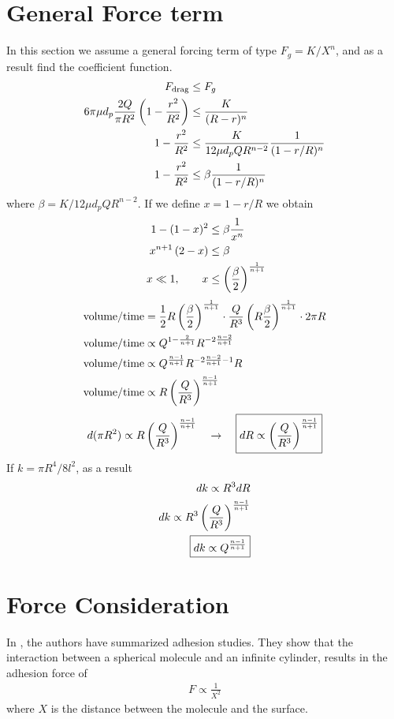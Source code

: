 %
\section{General Force term}
%
In this section we assume a general forcing term of type $F_{g} = K/X^n$, and
as a result find the coefficient function. 
%
\begin{align}
    F_{\text{drag}} &\leq  F_g \\
    6\pi \mu d_{p} \frac{2Q}{\pi R^2} \left( 1- \frac{r^2}{R^2} \right) & \leq \frac{K}{(R-r)^{n}} \\
    1 - \frac{r^2}{R^2} & \leq  \frac{K }{12 \mu  d_{p} Q R^{n-2}} \frac{1}{(1-r/R)^{n}}   \\
    1 -\frac{r^2}{R^2} &  \leq   \beta  \frac{1}{(1-r/R)^{n}}
\end{align}
%
where $\beta = {K }/{12 \mu d_{p} Q R^{n-2}} $. If we define $x = 1- r/R$ we obtain
%
\begin{align}
  1 - (1-x)^{2} & \leq \beta \frac{1}{x^{n}} \\
 x^{n+1} \left( 2 - x \right)  &\leq \beta  \\\
  x\ll 1 , \qquad x  & \leq \left( \frac{\beta}{2} \right)^{\frac{1}{n+1} } 
\end{align}
%
%
%
\begin{align}
  \text{volume}/\text{time} &= \frac{1}{2} R \left( \frac{\beta}{2} \right)^{\frac{1}{n+1} }  \cdot \frac{Q}{R^{3}} \left( R \frac{\beta}{2} \right)^{\frac{1}{n+1} } \cdot 2\pi R  \\
  \text{volume}/\text{time} &\propto  Q^{1 - \frac{2}{n+1} } R^{-2\frac{n-2}{n+1} } \\
  \text{volume}/\text{time} &\propto  Q^{\frac{n-1}{n+1} } R^{-2\frac{n-2}{n+1} -1}  R  \\
  \text{volume}/\text{time} &\propto  R  \left( \frac{Q}{R^{3}}   \right) ^{\frac{n-1}{n+1} }
\end{align}
%
%
\begin{align}
  d (\pi R^2) \propto R  \left( \frac{Q}{R^{3}}   \right) ^{\frac{n-1}{n+1} } \quad \to \quad \boxed{dR \propto \left( \frac{Q}{R^{3}}  \right) ^{\frac{n-1}{n+1} }}
\end{align}
%
If $k = \pi R^4/8l^2$, as a result
%
\begin{align}
  dk \propto R^{3} dR \\
  dk \propto R^3 \left( \frac{Q}{R^{3}}  \right) ^{\frac{n-1}{n+1} } \\
  \boxed{dk \propto Q^{\frac{n-1}{n+1}}}
\end{align}
%


\section{Force Consideration}
%
In \cite{montgomery2000analytical}, the authors have summarized
adhesion studies. They show that the interaction between a spherical
molecule and an infinite cylinder, results in the adhesion force of
%
\begin{align}
  F \propto \frac{1}{X^{2}} 
\end{align}
%
where $X$ is the distance between the molecule and the surface. 




